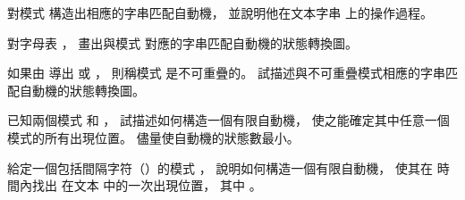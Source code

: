\startsection[
  title={String matching with finite automata},
]

\startEXERCISE
對模式  構造出相應的字串匹配自動機，
並說明他在文本字串  上的操作過程。
\stopEXERCISE

\startANSWER
{}
\stopANSWER

\startEXERCISE
對字母表 ，
畫出與模式  對應的字串匹配自動機的狀態轉換圖。
\stopEXERCISE

\startANSWER
{}
\stopANSWER

\startEXERCISE
如果由  導出  或 ，
則稱模式  是{\EMP 不可重疊的}。
試描述與不可重疊模式相應的字串匹配自動機的狀態轉換圖。
\stopEXERCISE

\startANSWER
{}
\stopANSWER

\startEXERCISE
已知兩個模式  和 ，
試描述如何構造一個有限自動機，
使之能確定其中任意一個模式的所有出現位置。
儘量使自動機的狀態數最小。
\stopEXERCISE

\startANSWER
{}
\stopANSWER

\startEXERCISE
給定一個包括間隔字符（）的模式 ，
說明如何構造一個有限自動機，
使其在  時間內找出  在文本  中的一次出現位置，
其中 。
\stopEXERCISE

\startANSWER
{}
\stopANSWER


\stopsection
